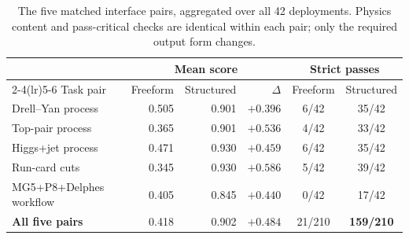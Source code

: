 \begin{table}[t]
\centering\small
\caption{The five matched interface pairs, aggregated over all 42 deployments. Physics content and
pass-critical checks are identical within each pair; only the required output form changes.}
\label{tab:pairs}
\begin{tabular}{lrrrcc}
\toprule
& \multicolumn{3}{c}{Mean score} & \multicolumn{2}{c}{Strict passes} \\
\cmidrule(lr){2-4}\cmidrule(lr){5-6}
Task pair & Freeform & Structured & $\Delta$ & Freeform & Structured \\
\midrule
Drell--Yan process & 0.505 & 0.901 & $+0.396$ & 6/42 & 35/42 \\
Top-pair process & 0.365 & 0.901 & $+0.536$ & 4/42 & 33/42 \\
Higgs+jet process & 0.471 & 0.930 & $+0.459$ & 6/42 & 35/42 \\
Run-card cuts & 0.345 & 0.930 & $+0.586$ & 5/42 & 39/42 \\
MG5+P8+Delphes workflow & 0.405 & 0.845 & $+0.440$ & 0/42 & 17/42 \\
\midrule
\textbf{All five pairs} & 0.418 & 0.902 & $\mathbf{+0.484}$ & 21/210 & \textbf{159/210} \\
\bottomrule
\end{tabular}
\end{table}
